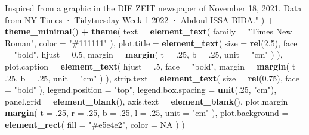 \documentclass[
]{book}
\newenvironment{Shaded}{\begin{snugshade}}{\end{snugshade}}
\newcommand{\AttributeTok}[1]{\textcolor[rgb]{0.13,0.29,0.53}{#1}}
\newcommand{\ConstantTok}[1]{\textcolor[rgb]{0.56,0.35,0.01}{#1}}
\newcommand{\DecValTok}[1]{\textcolor[rgb]{0.00,0.00,0.81}{#1}}
\newcommand{\FloatTok}[1]{\textcolor[rgb]{0.00,0.00,0.81}{#1}}
\newcommand{\FunctionTok}[1]{\textcolor[rgb]{0.13,0.29,0.53}{\textbf{#1}}}
\newcommand{\NormalTok}[1]{#1}
\newcommand{\SpecialCharTok}[1]{\textcolor[rgb]{0.81,0.36,0.00}{\textbf{#1}}}
\newcommand{\StringTok}[1]{\textcolor[rgb]{0.31,0.60,0.02}{#1}}
\begin{document}
\begin{Shaded}
\begin{Highlighting}[]
\StringTok{                  Inspired from a graphic in the DIE ZEIT newspaper of November 18, 2021.}
\StringTok{                  Data from NY Times · Tidytuesday Week{-}1 2022 · Abdoul ISSA BIDA."}
\NormalTok{  ) }\SpecialCharTok{+}
  \FunctionTok{theme\_minimal}\NormalTok{() }\SpecialCharTok{+}
  \FunctionTok{theme}\NormalTok{(}
    \AttributeTok{text =} \FunctionTok{element\_text}\NormalTok{(}
      \AttributeTok{family =} \StringTok{"Times New Roman"}\NormalTok{,}
      \AttributeTok{color =} \StringTok{"\#111111"}
\NormalTok{    ),}
    \AttributeTok{plot.title =} \FunctionTok{element\_text}\NormalTok{(}
      \AttributeTok{size =} \FunctionTok{rel}\NormalTok{(}\FloatTok{2.5}\NormalTok{),}
      \AttributeTok{face =} \StringTok{"bold"}\NormalTok{,}
      \AttributeTok{hjust =} \FloatTok{0.5}\NormalTok{,}
      \AttributeTok{margin =} \FunctionTok{margin}\NormalTok{(}
        \AttributeTok{t =}\NormalTok{ .}\DecValTok{25}\NormalTok{,}
        \AttributeTok{b =}\NormalTok{ .}\DecValTok{25}\NormalTok{,}
        \AttributeTok{unit =} \StringTok{"cm"}
\NormalTok{      )}
\NormalTok{    ),}
    \AttributeTok{plot.caption =} \FunctionTok{element\_text}\NormalTok{(}
      \AttributeTok{hjust =}\NormalTok{ .}\DecValTok{5}\NormalTok{,}
      \AttributeTok{face =} \StringTok{"bold"}\NormalTok{,}
      \AttributeTok{margin =} \FunctionTok{margin}\NormalTok{(}
        \AttributeTok{t =}\NormalTok{ .}\DecValTok{25}\NormalTok{,}
        \AttributeTok{b =}\NormalTok{ .}\DecValTok{25}\NormalTok{,}
        \AttributeTok{unit =} \StringTok{"cm"}
\NormalTok{      )}
\NormalTok{    ),}
    \AttributeTok{strip.text =} \FunctionTok{element\_text}\NormalTok{(}
      \AttributeTok{size =} \FunctionTok{rel}\NormalTok{(}\FloatTok{0.75}\NormalTok{),}
      \AttributeTok{face =} \StringTok{"bold"}
\NormalTok{    ),}
    \AttributeTok{legend.position =} \StringTok{"top"}\NormalTok{,}
    \AttributeTok{legend.box.spacing =} \FunctionTok{unit}\NormalTok{(.}\DecValTok{25}\NormalTok{, }\StringTok{"cm"}\NormalTok{),}
    \AttributeTok{panel.grid =} \FunctionTok{element\_blank}\NormalTok{(),}
    \AttributeTok{axis.text =} \FunctionTok{element\_blank}\NormalTok{(),}
    \AttributeTok{plot.margin =} \FunctionTok{margin}\NormalTok{(}
      \AttributeTok{t =}\NormalTok{ .}\DecValTok{25}\NormalTok{,}
      \AttributeTok{r =}\NormalTok{ .}\DecValTok{25}\NormalTok{,}
      \AttributeTok{b =}\NormalTok{ .}\DecValTok{25}\NormalTok{,}
      \AttributeTok{l =}\NormalTok{ .}\DecValTok{25}\NormalTok{,}
      \AttributeTok{unit =} \StringTok{"cm"}
\NormalTok{    ),}
    \AttributeTok{plot.background =} \FunctionTok{element\_rect}\NormalTok{(}
      \AttributeTok{fill =} \StringTok{"\#e5e4e2"}\NormalTok{,}
      \AttributeTok{color =} \ConstantTok{NA}
\NormalTok{    )}
\NormalTok{  )}
\end{Highlighting}
\end{Shaded}
\end{document}
